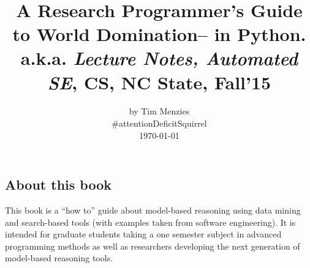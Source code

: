 \documentclass[9pt,twocolumn]{article}
\date{}
\begin{document}
 


\onecolumn
\title{
  {\bf {}}\\~\\~\\
    \\
    \Large{A Research Programmer's Guide to World Domination-- in Python.}\\
    \Large{a.k.a. {\em Lecture Notes, Automated
  SE}, CS, NC State, Fall'15}}
\author{by Tim Menzies \\\#attentionDeficitSquirrel\\\today}
   

\maketitle
\thispagestyle{empty}

\clearpage
\small
\twocolumn

\pagestyle{fancy}



\tableofcontents

\newpage


 \subsection*{About this book} This book is a  ``how to'' guide about model-based reasoning using
   data mining and search-based tools (with examples taken from software engineering).
   It is intended for graduate  students taking
  a one semester subject in advanced programming methods as
  well as researchers developing the next generation
  of model-based reasoning tools.  
\end{document}
